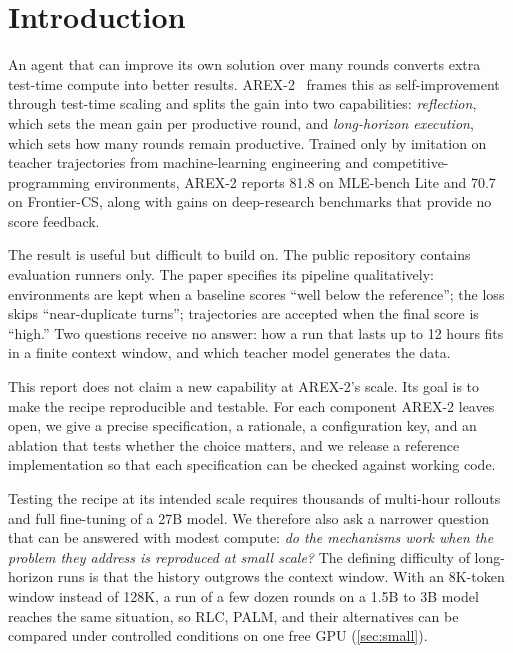 \documentclass[11pt]{article}
\begin{document}
\section{Introduction}

An agent that can improve its own solution over many rounds converts extra test-time compute into better results. AREX-2~\citep{qian2026arex2} frames this as self-improvement through test-time scaling and splits the gain into two capabilities: \emph{reflection}, which sets the mean gain per productive round, and \emph{long-horizon execution}, which sets how many rounds remain productive. Trained only by imitation on teacher trajectories from machine-learning engineering and competitive-programming environments, AREX-2 reports 81.8 on MLE-bench Lite and 70.7 on Frontier-CS, along with gains on deep-research benchmarks that provide no score feedback.

The result is useful but difficult to build on. The public repository contains evaluation runners only. The paper specifies its pipeline qualitatively: environments are kept when a baseline scores ``well below the reference''; the loss skips ``near-duplicate turns''; trajectories are accepted when the final score is ``high.'' Two questions receive no answer: how a run that lasts up to 12 hours fits in a finite context window, and which teacher model generates the data.

This report does not claim a new capability at AREX-2's scale. Its goal is to make the recipe reproducible and testable. For each component AREX-2 leaves open, we give a precise specification, a rationale, a configuration key, and an ablation that tests whether the choice matters, and we release a reference implementation so that each specification can be checked against working code.

Testing the recipe at its intended scale requires thousands of multi-hour rollouts and full fine-tuning of a 27B model. We therefore also ask a narrower question that can be answered with modest compute: \emph{do the mechanisms work when the problem they address is reproduced at small scale?} The defining difficulty of long-horizon runs is that the history outgrows the context window. With an 8K-token window instead of 128K, a run of a few dozen rounds on a 1.5B to 3B model reaches the same situation, so RLC, PALM, and their alternatives can be compared under controlled conditions on one free GPU (\cref{sec:small}).
\end{document}
